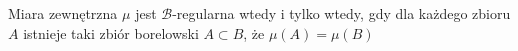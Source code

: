 \begin{defi}
    Miara zewnętrzna $\mu$ jest $\mathcal{B}$-regularna wtedy i tylko wtedy, gdy dla każdego zbioru $A$ istnieje taki
    zbiór borelowski $A \subset B$, że $\mu(A) = \mu(B)$
\end{defi}